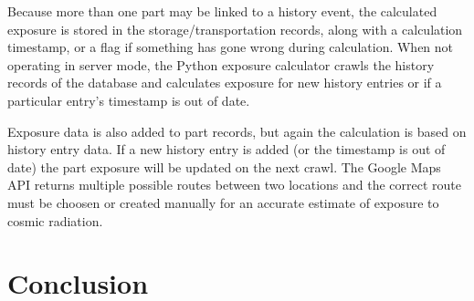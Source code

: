 \documentclass[journal]{IEEEtran}
\begin{document}
Because more than one part may be linked to a history event, the calculated exposure is
stored in the storage/transportation records, along with a calculation timestamp, or a flag
if something has gone wrong during calculation. When not operating in server mode, the Python
exposure calculator crawls the history records of the database and calculates exposure for
new history entries or if a particular entry's timestamp is out of date. 

Exposure data is also added to part records, but again the calculation is based on history
entry data. If a new history entry is added (or the timestamp is out of date) the part
exposure will be updated on the next crawl. The Google Maps API returns multiple possible
routes between two locations and the correct route must be choosen or created
manually for an accurate estimate of exposure to cosmic radiation.

\section{Conclusion}


%
%

\end{document}
